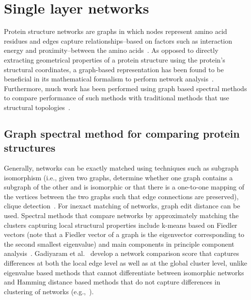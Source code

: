 \documentclass[10pt,letterpaper]{article}
\begin{document}
\section*{Single layer networks}
Protein structure networks are graphs in which nodes represent amino acid residues and edges capture relationships--based on factors such as interaction energy and proximity--between the amino acids~\cite{vijayabaskar2010interaction, bhattacharyya2016function}. As opposed to directly extracting geometrical properties of a protein structure using the protein's structural coordinates, a graph-based representation has been found to be beneficial in its mathematical formalism to perform network analysis~\cite{schieber2017network}. Furthermore, much work has been performed using graph based spectral methods to compare performance of such methods with traditional methods that use structural topologies~\cite{bhattacharyya2013automated, chakrabarty2014repeat, gadiyaram2017spectral}. 

\subsection*{Graph spectral method for comparing protein structures}
Generally, networks can be exactly matched using techniques such as subgraph isomorphism (i.e., given two graphs, determine whether one graph contains a subgraph of the other and is isomorphic or that there is a one-to-one mapping of the vertices between the two graphs such that edge connections are preserved), clique detection~\cite{gadiyaram2017spectral}. For inexact matching of networks, graph edit distance can be used. Spectral methods that compare networks by approximately matching the clusters capturing local structural properties include k-means based on Fiedler vectors (note that a Fiedler vector of a graph is the  eigenvector corresponding to the second smallest eigenvalue) and main components in principle component analysis~\cite{gadiyaram2017spectral}. Gadiyaram et al.~\cite{gadiyaram2017spectral} develop a network comparison score that captures differences at both the local edge level as well as at the global cluster level, unlike eigenvalue based methods that cannot differentiate between isomorphic networks and Hamming distance based methods that do not capture differences in clustering of networks (e.g.,~\cite{jurman2015him, jurman2011spectral}). 
\end{document}

